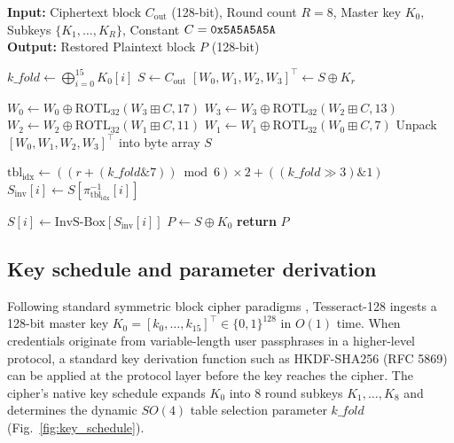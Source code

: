 \documentclass[10pt,twocolumn]{article}
\begin{document}
\begin{algorithm}[htbp]
\footnotesize
\caption{Tesseract-128 decryption pipeline.}
\label{alg:tesseract_dec}
\textbf{Input:} Ciphertext block $C_{\text{out}}$ (128-bit), Round count $R=8$, Master key $K_0$, Subkeys $\{K_1, \dots, K_R\}$, Constant $C = \text{\texttt{0x5A5A5A5A}}$ \\
\textbf{Output:} Restored Plaintext block $P$ (128-bit)
\begin{algorithmic}[1]
\STATE {}
\STATE $\mathit{k\_fold} \leftarrow \bigoplus_{i=0}^{15} K_0[i]$
\STATE $S \leftarrow C_{\text{out}}$
    \STATE {}
    \STATE $[W_0, W_1, W_2, W_3]^\top \leftarrow S \oplus K_r$
    
    \STATE {}
    \STATE $W_0 \leftarrow W_0 \oplus \text{ROTL}_{32}(W_3 \boxplus C, 17)$
    \STATE $W_3 \leftarrow W_3 \oplus \text{ROTL}_{32}(W_2 \boxplus C, 13)$
    \STATE $W_2 \leftarrow W_2 \oplus \text{ROTL}_{32}(W_1 \boxplus C, 11)$
    \STATE $W_1 \leftarrow W_1 \oplus \text{ROTL}_{32}(W_0 \boxplus C, 7)$
    \STATE Unpack $[W_0, W_1, W_2, W_3]^\top$ into byte array $S$
    
    \STATE {}
    \STATE $\text{tbl}_{\text{idx}} \leftarrow \left( (r + (\mathit{k\_fold} \mathbin{\&} 7)) \bmod 6 \right) \times 2 + ((\mathit{k\_fold} \gg 3) \mathbin{\&} 1)$
        \STATE $S_{\text{inv}}[i] \leftarrow S[\pi_{\text{tbl}_{\text{idx}}}^{-1}[i]]$
    \ENDFOR
    
    \STATE {}
        \STATE $S[i] \leftarrow \text{InvS-Box}[S_{\text{inv}}[i]]$
    \ENDFOR
\ENDFOR
\STATE {}
\STATE $P \leftarrow S \oplus K_0$
\STATE \textbf{return} $P$
\end{algorithmic}
\end{algorithm}

\subsection{Key schedule and parameter derivation}
Following standard symmetric block cipher paradigms \cite{nist2001fips}, Tesseract-128 ingests a 128-bit master key $K_0 = [k_0, \dots, k_{15}]^\top \in \{0, 1\}^{128}$ in $O(1)$ time. When credentials originate from variable-length user passphrases in a higher-level protocol, a standard key derivation function such as HKDF-SHA256 (RFC 5869) can be applied at the protocol layer before the key reaches the cipher. The cipher's native key schedule expands $K_0$ into 8 round subkeys $K_1, \dots, K_8$ and determines the dynamic $SO(4)$ table selection parameter $\mathit{k\_fold}$ (Fig.~\ref{fig:key_schedule}).
\end{document}

